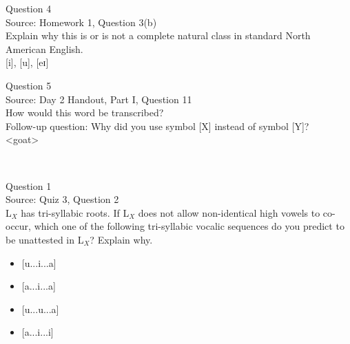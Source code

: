 \documentclass[12pt]{article}
\begin{document}
\newpage

{\large Question 4}\\

Source: Homework 1, Question 3(b)\\

Explain why this is or is not a complete natural class in standard North American English.\\

{[i]}, {[u]}, {[eɪ]}


\newpage

{\large Question 5}\\

Source: Day 2 Handout, Part I, Question 11\\

How would this word be transcribed?\\ Follow-up question: Why did you use symbol [X] instead of symbol [Y]?\\

<goat>


\newpage

\begin{center}
\textbf{{\color{red}{\HUGE END OF EXAM}}}\\

\end{center}
\newpage

\begin{center}
\textbf{{\color{blue}{\HUGE START OF EXAM\\}}}

\textbf{{\color{blue}{\HUGE Student ID: 9303\\}}}

\textbf{{\color{blue}{\HUGE 11:45 AM - 12:00 noon\\}}}

\end{center}
\newpage

{\large Question 1}\\

Source: Quiz 3, Question 2\\

L$_X$ has tri-syllabic roots. If L$_X$ does not allow non-identical high vowels to co-occur, which one of the following tri-syllabic vocalic sequences do you predict to be unattested in L$_X$? Explain why.\\

\begin{itemize} \item {[u...i...a]} \item {[a...i...a]} \item {[u...u...a]} \item {[a...i...i]} \end{itemize}
\end{document}
